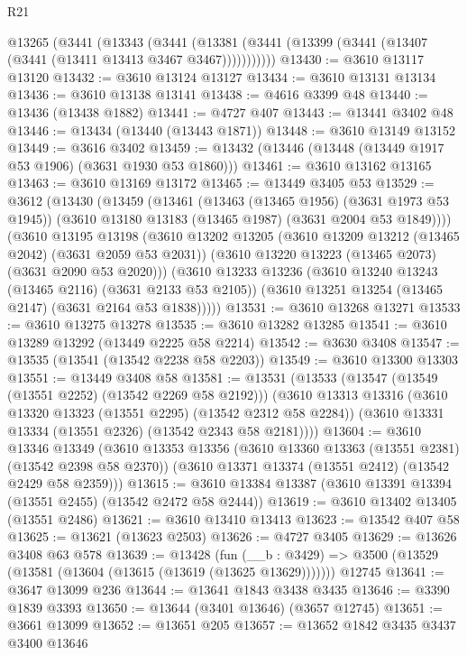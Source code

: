 \begin{lexlean}{R21}
\begin{coremodule}
    @13265
      (@3441
        (@13343
          (@3441 (@13381 (@3441 (@13399 (@3441 (@13407 (@3441 (@13411 @13413 @3467 @3467)))))))))))
@13430 := @3610 @13117 @13120
@13432 := @3610 @13124 @13127
@13434 := @3610 @13131 @13134
@13436 := @3610 @13138 @13141
@13438 := @4616 @3399 @48
@13440 := @13436 (@13438 @1882)
@13441 := @4727 @407
@13443 := @13441 @3402 @48
@13446 := @13434 (@13440 (@13443 @1871))
@13448 := @3610 @13149 @13152
@13449 := @3616 @3402
@13459 := @13432 (@13446 (@13448 (@13449 @1917 @53 @1906) (@3631 @1930 @53 @1860)))
@13461 := @3610 @13162 @13165
@13463 := @3610 @13169 @13172
@13465 := @13449 @3405 @53
@13529 := @3612
    (@13430
      (@13459
        (@13461
          (@13463 (@13465 @1956) (@3631 @1973 @53 @1945))
          (@3610 @13180 @13183 (@13465 @1987) (@3631 @2004 @53 @1849))))
      (@3610
        @13195
        @13198
        (@3610
          @13202
          @13205
          (@3610 @13209 @13212 (@13465 @2042) (@3631 @2059 @53 @2031))
          (@3610 @13220 @13223 (@13465 @2073) (@3631 @2090 @53 @2020)))
        (@3610
          @13233
          @13236
          (@3610 @13240 @13243 (@13465 @2116) (@3631 @2133 @53 @2105))
          (@3610 @13251 @13254 (@13465 @2147) (@3631 @2164 @53 @1838)))))
@13531 := @3610 @13268 @13271
@13533 := @3610 @13275 @13278
@13535 := @3610 @13282 @13285
@13541 := @3610 @13289 @13292 (@13449 @2225 @58 @2214)
@13542 := @3630 @3408
@13547 := @13535 (@13541 (@13542 @2238 @58 @2203))
@13549 := @3610 @13300 @13303
@13551 := @13449 @3408 @58
@13581 := @13531
    (@13533
      (@13547 (@13549 (@13551 @2252) (@13542 @2269 @58 @2192)))
      (@3610
        @13313
        @13316
        (@3610 @13320 @13323 (@13551 @2295) (@13542 @2312 @58 @2284))
        (@3610 @13331 @13334 (@13551 @2326) (@13542 @2343 @58 @2181))))
@13604 := @3610
    @13346
    @13349
    (@3610
      @13353
      @13356
      (@3610 @13360 @13363 (@13551 @2381) (@13542 @2398 @58 @2370))
      (@3610 @13371 @13374 (@13551 @2412) (@13542 @2429 @58 @2359)))
@13615 := @3610 @13384 @13387 (@3610 @13391 @13394 (@13551 @2455) (@13542 @2472 @58 @2444))
@13619 := @3610 @13402 @13405 (@13551 @2486)
@13621 := @3610 @13410 @13413
@13623 := @13542 @407 @58
@13625 := @13621 (@13623 @2503)
@13626 := @4727 @3405
@13629 := @13626 @3408 @63 @578
@13639 := @13428
    (fun (__b : @3429) => @3500 (@13529 (@13581 (@13604 (@13615 (@13619 (@13625 @13629)))))))
    @12745
@13641 := @3647 @13099 @236
@13644 := @13641 @1843 @3438 @3435
@13646 := @3390 @1839 @3393
@13650 := @13644 (@3401 @13646) (@3657 @12745)
@13651 := @3661 @13099
@13652 := @13651 @205
@13657 := @13652 @1842 @3435 @3437 @3400 @13646

\end{coremodule}
\end{lexlean}
